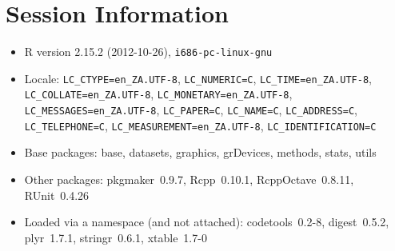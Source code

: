 \documentclass[10pt]{article}
\begin{document}
\section*{Session Information}
\begin{itemize}\raggedright
  \item R version 2.15.2 (2012-10-26), \verb|i686-pc-linux-gnu|
  \item Locale: \verb|LC_CTYPE=en_ZA.UTF-8|, \verb|LC_NUMERIC=C|, \verb|LC_TIME=en_ZA.UTF-8|, \verb|LC_COLLATE=en_ZA.UTF-8|, \verb|LC_MONETARY=en_ZA.UTF-8|, \verb|LC_MESSAGES=en_ZA.UTF-8|, \verb|LC_PAPER=C|, \verb|LC_NAME=C|, \verb|LC_ADDRESS=C|, \verb|LC_TELEPHONE=C|, \verb|LC_MEASUREMENT=en_ZA.UTF-8|, \verb|LC_IDENTIFICATION=C|
  \item Base packages: base, datasets, graphics, grDevices, methods,
    stats, utils
  \item Other packages: pkgmaker~0.9.7, Rcpp~0.10.1, RcppOctave~0.8.11,
    RUnit~0.4.26
  \item Loaded via a namespace (and not attached): codetools~0.2-8,
    digest~0.5.2, plyr~1.7.1, stringr~0.6.1, xtable~1.7-0
\end{itemize}
\end{document}
